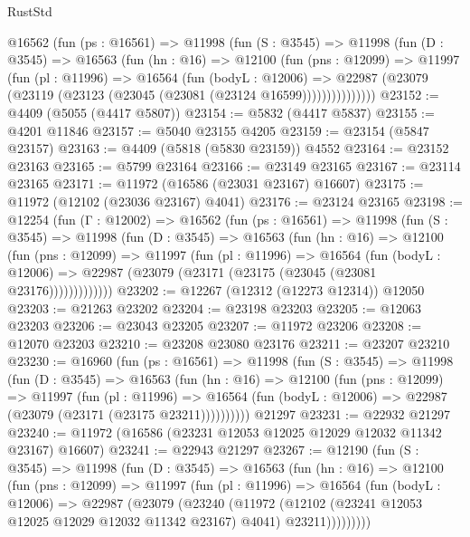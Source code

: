 \begin{lexlean}{RustStd}
\begin{coremodule}
      @16562
        (fun (ps : @16561) =>
        @11998
          (fun (S : @3545) =>
          @11998
            (fun (D : @3545) =>
            @16563
              (fun (hn : @16) =>
              @12100
                (fun (pns : @12099) =>
                @11997
                  (fun (pl : @11996) =>
                  @16564
                    (fun (bodyL : @12006) =>
                    @22987 (@23079 (@23119 (@23123 (@23045 (@23081 (@23124 @16599)))))))))))))))
@23152 := @4409 (@5055 (@4417 @5807))
@23154 := @5832 (@4417 @5837)
@23155 := @4201 @11846
@23157 := @5040 @23155 @4205
@23159 := @23154 (@5847 @23157)
@23163 := @4409 (@5818 (@5830 @23159)) @4552
@23164 := @23152 @23163
@23165 := @5799 @23164
@23166 := @23149 @23165
@23167 := @23114 @23165
@23171 := @11972 (@16586 (@23031 @23167) @16607)
@23175 := @11972 (@12102 (@23036 @23167) @4041)
@23176 := @23124 @23165
@23198 := @12254
    (fun (Γ : @12002) =>
    @16562
      (fun (ps : @16561) =>
      @11998
        (fun (S : @3545) =>
        @11998
          (fun (D : @3545) =>
          @16563
            (fun (hn : @16) =>
            @12100
              (fun (pns : @12099) =>
              @11997
                (fun (pl : @11996) =>
                @16564
                  (fun (bodyL : @12006) =>
                  @22987 (@23079 (@23171 (@23175 (@23045 (@23081 @23176)))))))))))))
@23202 := @12267 (@12312 (@12273 @12314)) @12050
@23203 := @21263 @23202
@23204 := @23198 @23203
@23205 := @12063 @23203
@23206 := @23043 @23205
@23207 := @11972 @23206
@23208 := @12070 @23203
@23210 := @23208 @23080 @23176
@23211 := @23207 @23210
@23230 := @16960
    (fun (ps : @16561) =>
    @11998
      (fun (S : @3545) =>
      @11998
        (fun (D : @3545) =>
        @16563
          (fun (hn : @16) =>
          @12100
            (fun (pns : @12099) =>
            @11997
              (fun (pl : @11996) =>
              @16564 (fun (bodyL : @12006) => @22987 (@23079 (@23171 (@23175 @23211))))))))))
    @21297
@23231 := @22932 @21297
@23240 := @11972 (@16586 (@23231 @12053 @12025 @12029 @12032 @11342 @23167) @16607)
@23241 := @22943 @21297
@23267 := @12190
    (fun (S : @3545) =>
    @11998
      (fun (D : @3545) =>
      @16563
        (fun (hn : @16) =>
        @12100
          (fun (pns : @12099) =>
          @11997
            (fun (pl : @11996) =>
            @16564
              (fun (bodyL : @12006) =>
              @22987
                (@23079
                  (@23240
                    (@11972
                      (@12102 (@23241 @12053 @12025 @12029 @12032 @11342 @23167) @4041)
                      @23211)))))))))

\end{coremodule}
\end{lexlean}
